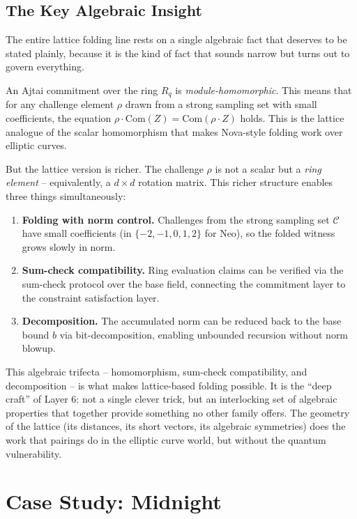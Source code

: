 \documentclass[
  11pt,
  openany]{report}
\providecommand{\tightlist}{%
  \setlength{\itemsep}{0pt}\setlength{\parskip}{0pt}}
\renewcommand{\textbf}[1]{{\bfseries\color{MidnightBold}#1}}
\begin{document}
\subsection{The Key Algebraic Insight}\label{the-key-algebraic-insight}

The entire lattice folding line rests on a single algebraic fact that deserves
to be stated plainly, because it is the kind of fact that sounds narrow but
turns out to govern everything.

An Ajtai commitment over the ring \(R_q\) is \emph{module-homomorphic}. This
means that for any challenge element \(\rho\) drawn from a strong sampling set
with small coefficients, the equation
\(\rho \cdot \text{Com}(Z) = \text{Com}(\rho \cdot Z)\) holds. This is the
lattice analogue of the scalar homomorphism that makes Nova-style folding work
over elliptic curves.

But the lattice version is richer. The challenge \(\rho\) is not a scalar but a
\emph{ring element} -- equivalently, a \(d \times d\) rotation matrix. This
richer structure enables three things simultaneously:

\begin{enumerate}
\def\labelenumi{\arabic{enumi}.}
\tightlist
\item
  \textbf{Folding with norm control.} Challenges from the strong sampling set
  \(\mathcal{C}\) have small coefficients (in \(\{-2, -1, 0, 1, 2\}\) for Neo),
  so the folded witness grows slowly in norm.
\item
  \textbf{Sum-check compatibility.} Ring evaluation claims can be verified via
  the sum-check protocol over the base field, connecting the commitment layer to
  the constraint satisfaction layer.
\item
  \textbf{Decomposition.} The accumulated norm can be reduced back to the base
  bound \(b\) via bit-decomposition, enabling unbounded recursion without norm
  blowup.
\end{enumerate}

This algebraic trifecta -- homomorphism, sum-check compatibility, and
decomposition -- is what makes lattice-based folding possible. It is the ``deep
craft'' of Layer 6: not a single clever trick, but an interlocking set of
algebraic properties that together provide something no other family offers. The
geometry of the lattice (its distances, its short vectors, its algebraic
symmetries) does the work that pairings do in the elliptic curve world, but
without the quantum vulnerability.

\section{Case Study: Midnight}\label{case-study-midnight}
\end{document}
